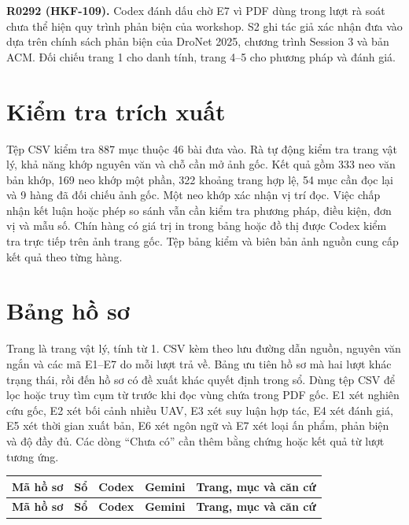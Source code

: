 \documentclass[10pt,a4paper]{article}
\begin{document}
\textbf{R0292 (HKF-109).} Codex đánh dấu chờ E7 vì PDF dùng trong lượt rà soát chưa thể hiện quy trình phản biện của workshop. S2 ghi tác giả xác nhận đưa vào dựa trên chính sách phản biện của DroNet 2025, chương trình Session 3 và bản ACM. Đối chiếu trang 1 cho danh tính, trang 4–5 cho phương pháp và đánh giá.



\section*{Kiểm tra trích xuất}
Tệp CSV kiểm tra 887 mục thuộc 46 bài đưa vào. Rà tự động kiểm tra trang vật lý, khả năng khớp nguyên văn và chỗ cần mở ảnh gốc. Kết quả gồm 333 neo văn bản khớp, 169 neo khớp một phần, 322 khoảng trang hợp lệ, 54 mục cần đọc lại và 9 hàng đã đối chiếu ảnh gốc. Một neo khớp xác nhận vị trí đọc. Việc chấp nhận kết luận hoặc phép so sánh vẫn cần kiểm tra phương pháp, điều kiện, đơn vị và mẫu số. Chín hàng có giá trị in trong bảng hoặc đồ thị được Codex kiểm tra trực tiếp trên ảnh trang gốc. Tệp bảng kiểm và biên bản ảnh nguồn cung cấp kết quả theo từng hàng.

\clearpage
\section*{Bảng hồ sơ}
Trang là trang vật lý, tính từ 1. CSV kèm theo lưu đường dẫn nguồn, nguyên văn ngắn và các mã E1–E7 do mỗi lượt trả về. Bảng ưu tiên hồ sơ mà hai lượt khác trạng thái, rồi đến hồ sơ có đề xuất khác quyết định trong sổ. Dùng tệp CSV để lọc hoặc truy tìm cụm từ trước khi đọc vùng chứa trong PDF gốc. E1 xét nghiên cứu gốc, E2 xét bối cảnh nhiều UAV, E3 xét suy luận hợp tác, E4 xét đánh giá, E5 xét thời gian xuất bản, E6 xét ngôn ngữ và E7 xét loại ấn phẩm, phản biện và độ đầy đủ. Các dòng “Chưa có” cần thêm bằng chứng hoặc kết quả từ lượt tương ứng.
\small
\begin{longtable}{@{}P{.12\linewidth}P{.09\linewidth}P{.10\linewidth}P{.10\linewidth}P{.46\linewidth}@{}}
\toprule
\textbf{Mã hồ sơ} & \textbf{Sổ} & \textbf{Codex} & \textbf{Gemini} & \textbf{Trang, mục và căn cứ} \\ \midrule
\endfirsthead
\toprule
\textbf{Mã hồ sơ} & \textbf{Sổ} & \textbf{Codex} & \textbf{Gemini} & \textbf{Trang, mục và căn cứ} \\ \midrule
\endhead

\end{longtable}
\end{document}
